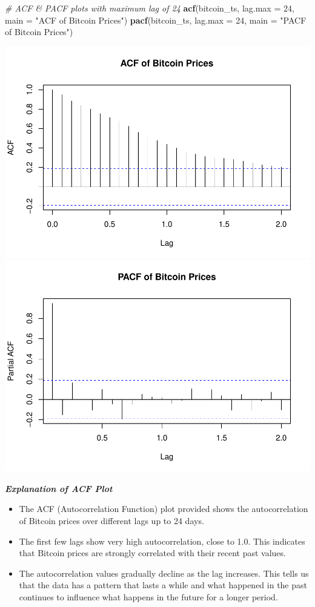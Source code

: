 \documentclass[
]{book}
\newenvironment{Shaded}{\begin{snugshade}}{\end{snugshade}}
\newcommand{\AttributeTok}[1]{\textcolor[rgb]{0.13,0.29,0.53}{#1}}
\newcommand{\CommentTok}[1]{\textcolor[rgb]{0.56,0.35,0.01}{\textit{#1}}}
\newcommand{\DecValTok}[1]{\textcolor[rgb]{0.00,0.00,0.81}{#1}}
\newcommand{\FunctionTok}[1]{\textcolor[rgb]{0.13,0.29,0.53}{\textbf{#1}}}
\newcommand{\NormalTok}[1]{#1}
\newcommand{\StringTok}[1]{\textcolor[rgb]{0.31,0.60,0.02}{#1}}
\begin{document}
\begin{Shaded}
\begin{Highlighting}[]
\CommentTok{\# ACF \& PACF plots with maximum lag of 24}
\FunctionTok{acf}\NormalTok{(bitcoin\_ts, }\AttributeTok{lag.max =} \DecValTok{24}\NormalTok{, }\AttributeTok{main =} \StringTok{"ACF of Bitcoin Prices"}\NormalTok{)}
\FunctionTok{pacf}\NormalTok{(bitcoin\_ts, }\AttributeTok{lag.max =} \DecValTok{24}\NormalTok{, }\AttributeTok{main =} \StringTok{"PACF of Bitcoin Prices"}\NormalTok{)}
\end{Highlighting}
\end{Shaded}

\includegraphics[width=0.5\linewidth]{bookdown-demo_files/figure-latex/figures-side-1} \includegraphics[width=0.5\linewidth]{bookdown-demo_files/figure-latex/figures-side-2}

\emph{\textbf{Explanation of ACF Plot}}

\begin{itemize}
\item
  The ACF (Autocorrelation Function) plot provided shows the autocorrelation of Bitcoin prices over different lags up to 24 days.
\item
  The first few lags show very high autocorrelation, close to 1.0. This indicates that Bitcoin prices are strongly correlated with their recent past values.
\item
  The autocorrelation values gradually decline as the lag increases. This tells us that the data has a pattern that lasts a while and what happened in the past continues to influence what happens in the future for a longer period.
\end{itemize}
\end{document}
